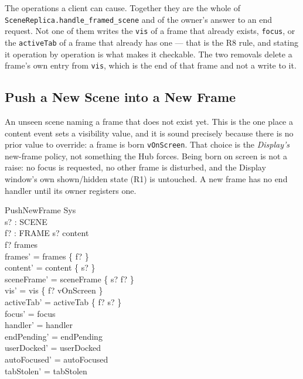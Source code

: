 \documentclass[a4paper,10pt,fleqn]{article}
\begin{document}
The operations a client can cause.  Together they are the whole of
\texttt{SceneReplica.handle\_framed\_scene} and of the owner's answer to an
end request.  Not one of them writes the \texttt{vis} of a frame that already
exists, \texttt{focus}, or the \texttt{activeTab} of a frame that already has
one --- that is the R8 rule, and stating it operation by operation is what
makes it checkable.  The two removals delete a frame's own entry from
\texttt{vis}, which is the end of that frame and not a write to it.

\subsection{Push a New Scene into a New Frame}

An unseen scene naming a frame that does not exist yet.  This is the one
place a content event sets a visibility value, and it is sound precisely
because there is no prior value to override: a frame is born
\texttt{vOnScreen}.  That choice is the \emph{Display's} new-frame policy, not
something the Hub forces.  Being born on screen is not a raise: no focus is
requested, no other frame is disturbed, and the Display window's own
shown/hidden state (R1) is untouched.  A new frame has no end handler until
its owner registers one.

\begin{schema}{PushNewFrame}
  \Delta Sys \\
  s? : SCENE \\
  f? : FRAME
\where
  s? \notin content \\
  f? \notin frames \\
  frames' = frames \cup \{ f? \} \\
  content' = content \cup \{ s? \} \\
  sceneFrame' = sceneFrame \cup \{ s? \mapsto f? \} \\
  vis' = vis \cup \{ f? \mapsto vOnScreen \} \\
  activeTab' = activeTab \cup \{ f? \mapsto s? \} \\
  focus' = focus \\
  handler' = handler \\
  endPending' = endPending \\
  userDocked' = userDocked \\
  autoFocused' = autoFocused \\
  tabStolen' = tabStolen
\end{schema}
\end{document}
